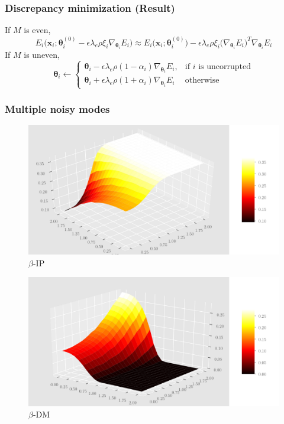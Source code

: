 \documentclass[10pt]{beamer}
\begin{document}
\begin{frame}
\frametitle{Discrepancy minimization (Result)}
If $M$ is even,
\begin{equation}
E_i\big(\mathbf{x}_i;\bm{\theta}_i^{(0)} - \epsilon\lambda_e\rho\xi_i\nabla_{\bm{\theta}_i}E_i\big) \approx E_i\big(\mathbf{x}_i;\bm{\theta}_i^{(0)}\big) - \epsilon\lambda_e\rho\xi_i\big(\nabla_{\bm{\theta}_i}E_i\big)^T\nabla_{\bm{\theta}_i}E_i
\end{equation}
If $M$ is uneven,
\begin{equation}
\bm{\theta}_i \leftarrow \begin{cases}
       \bm{\theta}_i - \epsilon\lambda_e\rho(1-\alpha_i)\nabla_{\bm{\theta}_i}E_i, & \text{if $i$ is uncorrupted} \\
       \bm{\theta}_i + \epsilon\lambda_e\rho(1+\alpha_i)\nabla_{\bm{\theta}_i}E_i & \text{otherwise}
    \end{cases}
\end{equation}
\end{frame}

\begin{frame}
\frametitle{Multiple noisy modes}
\begin{multicols}{2}
\begin{figure}
\centering
\includegraphics[scale=0.18]{figs/Figure_1} 
  \caption{$\beta$-IP}
\end{figure}
\columnbreak
\begin{figure}
\centering
\includegraphics[scale=0.18]{figs/Figure_2} 
  \caption{$\beta$-DM}
\end{figure}
\end{multicols}
\end{frame}
\end{document}
